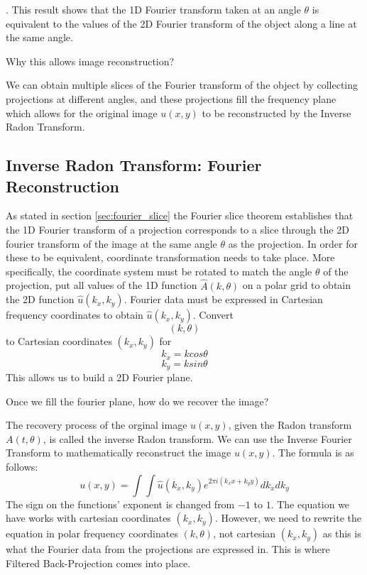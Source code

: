 \documentclass{article}
\begin{document}
\cite{Ft_pt2}. This result shows that the 1D Fourier transform taken at an angle $\theta$ is equivalent to the values of the 2D Fourier transform of the object along a line at the same angle. 

Why this allows image reconstruction?

We can obtain multiple slices of the Fourier transform of the object by collecting projections at different angles, and these projections fill the frequency plane which allows for the original image $u(x,y)$ to be reconstructed by the Inverse Radon Transform.


\subsection{Inverse Radon Transform: Fourier Reconstruction}

As stated in section \ref{sec:fourier_slice} the Fourier slice theorem establishes that the 1D Fourier transform of a projection corresponds to a slice through the 2D fourier transform of the image at the same angle $\theta$ as the projection. In order for these to be equivalent, coordinate transformation needs to take place. More specifically, the coordinate system must be rotated to match the angle $\theta$ of the projection, put all values of the 1D function $\hat{A}(k,\theta)$ on a polar grid to obtain the 2D function $\hat{u}(k_{x}, k_{y})$. Fourier data must be expressed in Cartesian frequency coordinates to obtain $\hat{u}(k_{x},k_{y})$.
Convert 
\[(k, \theta)\]
to Cartesian coordinates $(k_{x}, k_{y})$ for
\[k_{x} = kcos\theta\]
\[k_{y} = ksin\theta\]
This allows us to build a 2D Fourier plane. \cite{Ft_pt2}

Once we fill the fourier plane, how do we recover the image? 

The recovery process of the orginal image $u(x,y)$, given the Radon transform $A(t,\theta)$, is called the inverse Radon transform. We can use the Inverse Fourier Transform to mathematically reconstruct the image $u(x,y)$. The formula is as follows: 
\[u(x,y) = \int \int \hat{u}(k_x, k_y) e^{2\pi i(k_{x}x + k_{y}y)}dk_{x}dk_{y}\]
The sign on the functions' exponent is changed from $-1$ to $1$. The equation we have works with cartesian coordinates $(k_x , k_y)$. However, we need to rewrite the equation in polar frequency coordinates $(k, \theta)$, not cartesian $(k_x , k_y)$ as this is what the Fourier data from the projections are expressed in. This is where Filtered Back-Projection comes into place. \cite{Back_projection}
\end{document}
